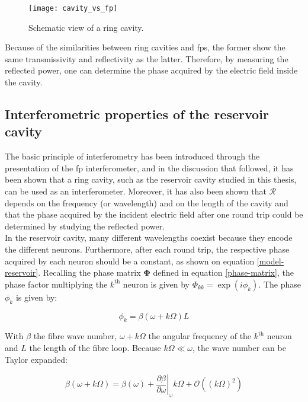 \begin{figure}[h]
	\centering
	\texttt{[image: cavity\_vs\_fp]}
	\caption{Schematic view of a ring cavity.}
	\label{cavity_vs_fp}
\end{figure}

Because of the similarities between ring cavities and \glspl{fp}, the former show the same transmissivity and reflectivity as the latter. Therefore, by measuring the reflected power, one can determine the phase acquired by the electric field inside the cavity.


\subsection{Interferometric properties of the reservoir cavity}

The basic principle of interferometry has been introduced through the presentation of the \gls{fp} interferometer, and in the discussion that followed, it has been shown that a ring cavity, such as the reservoir cavity studied in this thesis, can be used as an interferometer. Moreover, it has also been shown that $\mathcal{R}$ depends on the frequency (or wavelength) and on the length of the cavity and that the phase acquired by the incident electric field after one round trip could be determined by studying the reflected power.\\

In the reservoir cavity, many different wavelengths coexist because they encode the different neurons. Furthermore, after each round trip, the respective phase acquired by each neuron should be a constant, as shown on equation \eqref{model-reservoir}. Recalling the phase matrix $\mathbf{\Phi}$ defined in equation \eqref{phase-matrix}, the phase factor multiplying the $k^{\text{th}}$ neuron is given by $\Phi_{kk} = \exp{(i\phi_k)}$.	The phase $\phi_k$ is given by:

\begin{equation}
	\phi_k = \beta(\omega+k\Omega) L
\end{equation}

With $\beta$ the fibre wave number, $\omega+k\Omega$ the angular frequency of the $k^{\text{th}}$ neuron and $L$ the length of the fibre loop. Because $k\Omega \ll \omega$, the wave number can be Taylor expanded: 

\begin{equation}
	\beta(\omega+k\Omega) = \beta(\omega) + \left. \frac{\partial\beta}{\partial\omega}\right\rvert_\omega k\Omega + \mathcal{O}\left((k\Omega)^2\right)
\end{equation}

